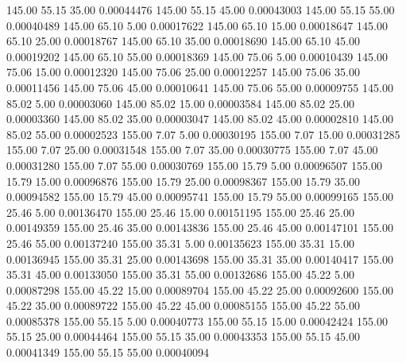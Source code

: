     145.00     55.15     35.00     0.00044476
    145.00     55.15     45.00     0.00043003
    145.00     55.15     55.00     0.00040489
    145.00     65.10      5.00     0.00017622
    145.00     65.10     15.00     0.00018647
    145.00     65.10     25.00     0.00018767
    145.00     65.10     35.00     0.00018690
    145.00     65.10     45.00     0.00019202
    145.00     65.10     55.00     0.00018369
    145.00     75.06      5.00     0.00010439
    145.00     75.06     15.00     0.00012320
    145.00     75.06     25.00     0.00012257
    145.00     75.06     35.00     0.00011456
    145.00     75.06     45.00     0.00010641
    145.00     75.06     55.00     0.00009755
    145.00     85.02      5.00     0.00003060
    145.00     85.02     15.00     0.00003584
    145.00     85.02     25.00     0.00003360
    145.00     85.02     35.00     0.00003047
    145.00     85.02     45.00     0.00002810
    145.00     85.02     55.00     0.00002523
    155.00      7.07      5.00     0.00030195
    155.00      7.07     15.00     0.00031285
    155.00      7.07     25.00     0.00031548
    155.00      7.07     35.00     0.00030775
    155.00      7.07     45.00     0.00031280
    155.00      7.07     55.00     0.00030769
    155.00     15.79      5.00     0.00096507
    155.00     15.79     15.00     0.00096876
    155.00     15.79     25.00     0.00098367
    155.00     15.79     35.00     0.00094582
    155.00     15.79     45.00     0.00095741
    155.00     15.79     55.00     0.00099165
    155.00     25.46      5.00     0.00136470
    155.00     25.46     15.00     0.00151195
    155.00     25.46     25.00     0.00149359
    155.00     25.46     35.00     0.00143836
    155.00     25.46     45.00     0.00147101
    155.00     25.46     55.00     0.00137240
    155.00     35.31      5.00     0.00135623
    155.00     35.31     15.00     0.00136945
    155.00     35.31     25.00     0.00143698
    155.00     35.31     35.00     0.00140417
    155.00     35.31     45.00     0.00133050
    155.00     35.31     55.00     0.00132686
    155.00     45.22      5.00     0.00087298
    155.00     45.22     15.00     0.00089704
    155.00     45.22     25.00     0.00092600
    155.00     45.22     35.00     0.00089722
    155.00     45.22     45.00     0.00085155
    155.00     45.22     55.00     0.00085378
    155.00     55.15      5.00     0.00040773
    155.00     55.15     15.00     0.00042424
    155.00     55.15     25.00     0.00044464
    155.00     55.15     35.00     0.00043353
    155.00     55.15     45.00     0.00041349
    155.00     55.15     55.00     0.00040094
